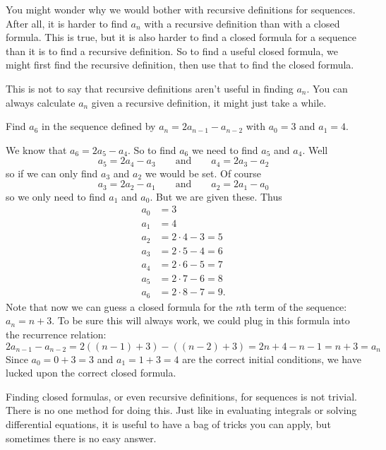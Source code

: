 \documentclass[12pt]{article}
\begin{document}
You might wonder why we would bother with recursive definitions for sequences.  After all, it is harder to find $a_n$ with a recursive definition than with a closed formula.  This is true, but it is also harder to find a closed formula for a sequence than it is to find a recursive definition.  So to find a useful closed formula, we might first find the recursive definition, then use that to find the closed formula.  

This is not to say that recursive definitions aren't useful in finding $a_n$.  You can always calculate $a_n$ given a recursive definition, it might just take a while.

\begin{example}
 Find $a_6$ in the sequence defined by $a_n = 2a_{n-1} - a_{n-2}$ with $a_0 = 3$ and $a_1 = 4$.  
 \begin{solution}
  We know that $a_6 = 2a_5 - a_4$.  So to find $a_6$ we need to find $a_5$ and $a_4$.  Well \[a_5 = 2a_4 - a_3 \qquad \mbox{and} \qquad a_4 = 2a_3 - a_2\]
  so if we can only find $a_3$ and $a_2$ we would be set.  Of course
  \[a_3 = 2a_2 - a_1 \qquad \mbox{and} \qquad a_2 = 2a_1 - a_0\]
  so we only need to find $a_1$ and $a_0$.  But we are given these.  Thus
  \begin{align*}
   a_0 & = 3 \\
   a_1 & = 4 \\
   a_2 & = 2\cdot 4 - 3 = 5\\
   a_3 & = 2\cdot 5 - 4 = 6\\
   a_4 & = 2\cdot 6 - 5 = 7\\
   a_5 & = 2\cdot 7 - 6 = 8\\
   a_6 & = 2\cdot 8 - 7 = 9.
  \end{align*}
 Note that now we can guess a closed formula for the $n$th term of the sequence: $a_n = n+3$.  To be sure this will always work, we could plug in this formula into the recurrence relation: \[2a_{n-1} - a_{n-2} = 2((n-1) + 3) - ((n-2) + 3) = 2n + 4 - n - 1 = n + 3 = a_n\]
 Since $a_0 = 0 + 3 = 3$ and $a_1 = 1+3 = 4$ are the correct initial conditions, we have lucked upon the correct closed formula.
 \end{solution}

\end{example}


Finding closed formulas, or even recursive definitions, for sequences is not trivial. There is no one method for doing this.  Just like in evaluating integrals or solving differential equations, it is useful to have a bag of tricks you can apply, but sometimes there is no easy answer.
\end{document}
